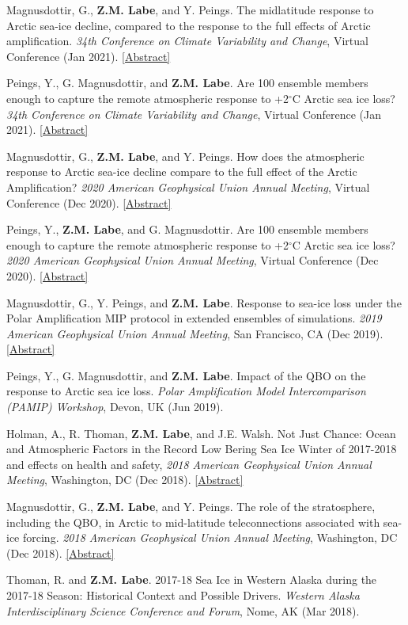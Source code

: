 \documentclass[margin,line,palatino,courier,10pt]{res}
\begin{document}
\begin{resume}
\begin{etaremune}[leftmargin=0in,topsep=0in,parsep=0in]
\item Magnusdottir, G., \textbf{Z.M. Labe}, and Y. Peings. The midlatitude response to Arctic sea-ice decline, compared to the response to the full effects of Arctic amplification. \textit{34th Conference on Climate Variability and Change}, Virtual Conference (Jan 2021). \href{https://ams.confex.com/ams/101ANNUAL/meetingapp.cgi/Paper/382356}{[Abstract]}
\item Peings, Y., G. Magnusdottir, and \textbf{Z.M. Labe}. Are 100 ensemble members enough to capture the remote atmospheric response to +2$^{\circ}$C Arctic sea ice loss? \textit{34th Conference on Climate Variability and Change}, Virtual Conference (Jan 2021). \href{https://ams.confex.com/ams/101ANNUAL/meetingapp.cgi/Paper/382352}{[Abstract]}
\item Magnusdottir, G., \textbf{Z.M. Labe}, and Y. Peings. How does the atmospheric response to Arctic sea-ice decline compare to the full effect of the Arctic Amplification? \textit{2020 American Geophysical Union Annual Meeting}, Virtual Conference (Dec 2020). \href{https://agu.confex.com/agu/fm20/meetingapp.cgi/Paper/678706}{[Abstract]}
\item Peings, Y., \textbf{Z.M. Labe}, and G. Magnusdottir. Are 100 ensemble members enough to capture the remote atmospheric response to +2$^{\circ}$C Arctic sea ice loss? \textit{2020 American Geophysical Union Annual Meeting}, Virtual Conference (Dec 2020). \href{https://agu.confex.com/agu/fm20/meetingapp.cgi/Paper/685885}{[Abstract]}
\item Magnusdottir, G., Y. Peings, and \textbf{Z.M. Labe}. Response to sea-ice loss under the Polar Amplification MIP protocol in extended ensembles of simulations. \textit{2019 American Geophysical Union Annual Meeting}, San Francisco, CA (Dec 2019). \href{https://agu.confex.com/agu/fm19/meetingapp.cgi/Paper/553470}{[Abstract]}
\item Peings, Y., G. Magnusdottir, and \textbf{Z.M. Labe}. Impact of the QBO on the response to Arctic sea ice loss. \textit{Polar Amplification Model Intercomparison (PAMIP) Workshop}, Devon, UK (Jun 2019).
\item Holman, A., R. Thoman, \textbf{Z.M. Labe}, and J.E. Walsh. Not Just Chance: Ocean and Atmospheric Factors in the Record Low Bering Sea Ice Winter of 2017-2018 and effects on health and safety, \textit{2018 American Geophysical Union Annual Meeting}, Washington, DC (Dec 2018). \href{https://agu.confex.com/agu/fm18/meetingapp.cgi/Paper/451295}{[Abstract]}
\item Magnusdottir, G., \textbf{Z.M. Labe}, and Y. Peings. The role of the stratosphere, including the QBO, in Arctic to mid-latitude teleconnections associated with sea-ice forcing. \textit{2018 American Geophysical Union Annual Meeting}, Washington, DC (Dec 2018). \href{https://agu.confex.com/agu/fm18/meetingapp.cgi/Paper/399117}{[Abstract]}
\item Thoman, R. and \textbf{Z.M. Labe}. 2017-18 Sea Ice in Western Alaska during the 2017-18 Season: Historical Context and Possible Drivers. \textit{Western Alaska Interdisciplinary Science Conference and Forum}, Nome, AK (Mar 2018). 


\end{etaremune}
\end{resume}
\end{document}
